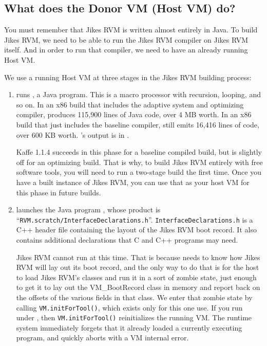 \subsection{What does the Donor VM (Host VM) do?}

You must remember that Jikes RVM is written almost entirely in Java.
To build Jikes RVM, we need to be able to run the Jikes RVM compiler
on Jikes RVM itself.  And in order to run that compiler, we need to
have an already running Host VM.  

We use a running Host VM at three stages in the Jikes RVM
building process:

\begin{enumerate}

%
\item {} runs \gft{}, a Java program.
This is a macro processor with recursion, looping,
and so on.   In an x86 \jrvm{} build that includes the adaptive system and
optimizing compiler, \gft{} produces 115,900 lines of Java code, over
4 MB worth.    In an x86 \jrvm{} build that just includes the baseline
compiler, \gft{} still emits 16,416 lines of code, over 600 KB
worth.    \gft's output is in .

Kaffe 1.1.4 succeeds in this phase for a baseline compiled build, but
is slightly off for an optimizing build.  That is why, to build Jikes
RVM entirely with free software tools, you will need to run a
two-stage build the first time.  Once you have a built instance of
Jikes RVM, you can use that as your host VM for this phase in future
builds.

\item {} 
launches the Java program \gid{}, whose product is
``\texttt{RVM.scratch/InterfaceDeclarations.h}''.
\texttt{InterfaceDeclarations.h} is a C++ header file containing the layout of
the Jikes RVM boot record.  It also contains additional declarations
that C and C++ programs may need.

Jikes RVM cannot run \gid{} at this time.  That is because \gid{}
needs to know how Jikes RVM will lay out its boot record, and the only
way to do that is for the host to load Jikes RVM's classes and run it
in a sort of zombie state, just enough to get it to lay out the
VM\_BootRecord class in memory and report back on the offsets of the
various fields in that class.  We enter that zombie state by calling
\texttt{VM.initForTool()}, which exists only for this one use. 
 If you run \gid{} under \jrvm{},
then \texttt{VM.initForTool()} reinitializes the running VM.  The
runtime system immediately forgets that it already loaded a currently
executing program, and quickly aborts with a VM internal error.



\end{enumerate}

